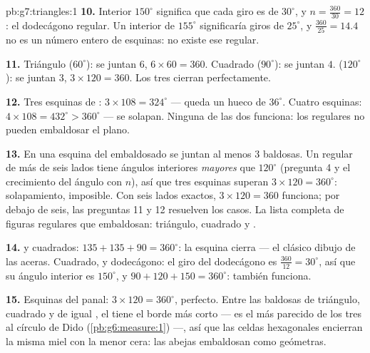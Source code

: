 \begin{solution}{pb:g7:triangles:1}
\textbf{10.} Interior $150^\circ$ significa que cada giro es de
$30^\circ$, y $n = \frac{360}{30} = 12$: el dodecágono regular.
Un interior de $155^\circ$ significaría giros de $25^\circ$, y
$\frac{360}{25} = 14.4$ no es un número entero de esquinas: no existe
ese  regular.

\textbf{11.} Triángulo ($60^\circ$): se juntan $6$,
$6 \times 60 = 360$. Cuadrado ($90^\circ$): se juntan $4$. 
($120^\circ$): se juntan $3$, $3 \times 120 = 360$. Los tres cierran
perfectamente.

\textbf{12.} Tres esquinas de : $3 \times 108 = 324^\circ$
--- queda un hueco de $36^\circ$. Cuatro esquinas:
$4 \times 108 = 432^\circ > 360^\circ$ --- se solapan. Ninguna de las dos
funciona: los  regulares no pueden embaldosar el plano.

\textbf{13.} En una esquina del embaldosado se juntan al menos $3$ baldosas. Un
 regular de más de seis lados tiene ángulos interiores
\emph{mayores} que $120^\circ$ (pregunta 4 y el crecimiento del
ángulo con $n$), así que tres esquinas superan
$3 \times 120 = 360^\circ$: solapamiento, imposible. Con seis lados
exactos, $3 \times 120 = 360$ funciona; por debajo de seis, las preguntas 11
y 12 resuelven los casos. La lista completa de figuras regulares que embaldosan:
triángulo, cuadrado y .

\textbf{14.}  y cuadrados:
$135 + 135 + 90 = 360^\circ$: la esquina cierra --- el clásico
dibujo de las aceras. Cuadrado,  y dodecágono: el giro del
dodecágono es $\frac{360}{12} = 30^\circ$, así que su ángulo interior es
$150^\circ$, y $90 + 120 + 150 = 360^\circ$: también funciona.

\textbf{15.} Esquinas del panal: $3 \times 120 = 360^\circ$,
perfecto. Entre las baldosas de triángulo, cuadrado y  de igual
, el  tiene el borde más corto --- es el
más parecido de los tres al círculo de Dido
(\cref{pb:g6:measure:1}) ---, así que las celdas hexagonales encierran
la misma miel con la menor cera: las abejas embaldosan como geómetras.
\end{solution}
